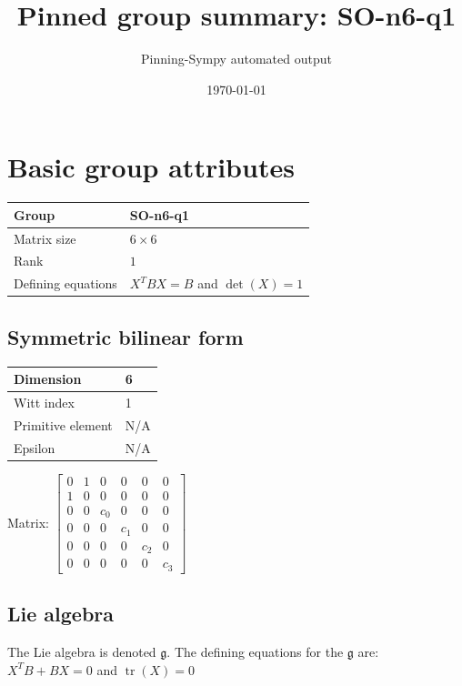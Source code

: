 \documentclass[11pt]{article}
\title{Pinned group summary: SO-n6-q1}
\author{Pinning-Sympy automated output}
\date{\today}
\newcommand{\frakg}{\mathfrak{g}}
\theoremstyle{definition}
\begin{document}
\maketitle
\tableofcontents

\newpage

\section{Basic group attributes}

\def\arraystretch{1.2}
\begin{tabular}{|l|l|}
	\hline
    Group & SO-n6-q1 \\
	\hline
    Matrix size & $6 \times 6$ \\
	\hline
    Rank & $1$ \\
	\hline
	Defining equations & $X^TBX = B$ and $\operatorname{det}(X)=1$ \\
	\hline
\end{tabular}
\def\arraystretch{1}

\subsection{Symmetric bilinear form}
\begin{tabular}{|l|l|}
    \hline
    Dimension & 6 \\
    \hline
    Witt index & 1 \\
    \hline
    Primitive element & N/A \\
    \hline
    Epsilon & N/A \\
    \hline
\end{tabular}

\bigskip
\noindent Matrix: \(
\left[\begin{matrix}0 & 1 & 0 & 0 & 0 & 0\\1 & 0 & 0 & 0 & 0 & 0\\0 & 0 & c_{0} & 0 & 0 & 0\\0 & 0 & 0 & c_{1} & 0 & 0\\0 & 0 & 0 & 0 & c_{2} & 0\\0 & 0 & 0 & 0 & 0 & c_{3}\end{matrix}\right]
\)



\subsection{Lie algebra}

The Lie algebra is denoted $\frakg$. The defining equations for the $\frakg$ are: $X^TB + BX = 0$ and $\operatorname{tr}(X)=0$
\end{document}
